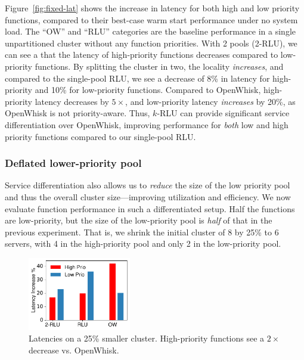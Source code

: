 Figure~\ref{fig:fixed-lat} shows the increase in latency for both high and low priority functions, compared to their best-case warm start performance under no system load.
The ``OW'' and ``RLU'' categories are the baseline performance in a single unpartitioned cluster without any function priorities.  
With 2 pools (2-RLU), we can see a that the latency of high-priority functions decreases compared to low-priority functions. 
By splitting the cluster in two, the locality \emph{increases}, and compared to the single-pool RLU, we see a decrease of 8\% in latency for high-priority and 10\% for low-priority functions. 
Compared to OpenWhisk, high-priority latency decreases by $5\times$, and low-priority latency \emph{increases} by 20\%, as OpenWhisk is not priority-aware.
Thus, $k$-RLU can provide significant service differentiation over OpenWhisk, improving performance for \emph{both} low and high priority functions compared to our single-pool RLU.


\subsubsection{Deflated lower-priority pool}

Service differentiation also allows us to \emph{reduce} the size of the low priority pool and thus the overall cluster size---improving utilization and efficiency.
We now evaluate function performance in such a differentiated setup.
Half the functions are low-priority, but the size of the low-priority pool is \emph{half} of that in the previous experiment.
That is, we shrink the initial cluster of 8 by 25\% to 6 servers, with 4 in the high-priority pool and only 2 in the low-priority pool.

\begin{figure}
  \centering \includegraphics[width=0.4\textwidth]{../Figures/fixed/qos2.pdf} %
  \caption{Latencies on a 25\% smaller cluster. High-priority functions see a $2\times$ decrease vs. OpenWhisk.}
  \label{fig:shrunk-lat}
\end{figure}

